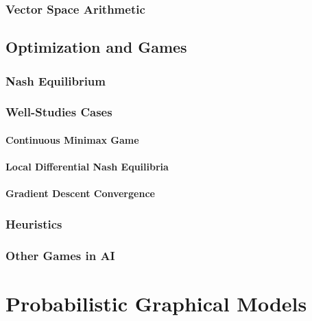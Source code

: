 		\subsection{Vector Space Arithmetic} %

	\section{Optimization and Games} %

		\subsection{Nash Equilibrium} %

		\subsection{Well-Studies Cases} %

			\subsubsection{Continuous Minimax Game} %

			\subsubsection{Local Differential Nash Equilibria} %

			\subsubsection{Gradient Descent Convergence} %

		\subsection{Heuristics} %

		\subsection{Other Games in AI} %

\chapter{Probabilistic Graphical Models} %

